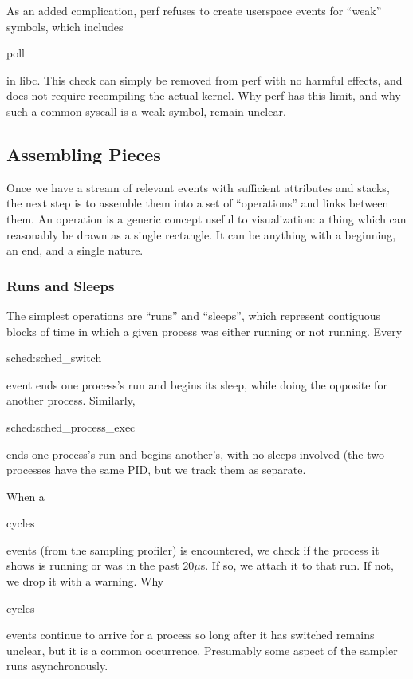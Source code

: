 \documentclass[10pt]{article}
\begin{document}
As an added complication, perf refuses to create userspace events for ``weak'' symbols, which includes \begin{tt}poll\end{tt} in libc.  This check can simply be removed from perf with no harmful effects, and does not require recompiling the actual kernel.  Why perf has this limit, and why such a common syscall is a weak symbol, remain unclear.

\subsection{Assembling Pieces}

Once we have a stream of relevant events with sufficient attributes and stacks, the next step is to assemble them into a set of ``operations'' and links between them.  An operation is a generic concept useful to visualization: a thing which can reasonably be drawn as a single rectangle.  It can be anything with a beginning, an end, and a single nature.

\subsubsection{Runs and Sleeps}

The simplest operations are ``runs'' and ``sleeps'', which represent contiguous blocks of time in which a given process was either running or not running.  Every \begin{tt}sched:sched\_switch\end{tt} event ends one process's run and begins its sleep, while doing the opposite for another process.  Similarly, \begin{tt}sched:sched\_process\_exec\end{tt} ends one process's run and begins another's, with no sleeps involved (the two processes have the same PID, but we track them as separate.

When a \begin{tt}cycles\end{tt} events (from the sampling profiler) is encountered, we check if the process it shows is running or was in the past $20 \mu$s.  If so, we attach it to that run.  If not, we drop it with a warning.  Why \begin{tt}cycles\end{tt} events continue to arrive for a process so long after it has switched remains unclear, but it is a common occurrence.  Presumably some aspect of the sampler runs asynchronously.
\end{document}
